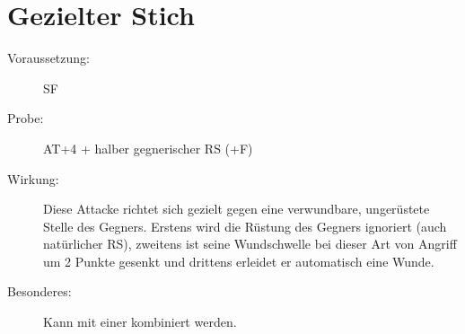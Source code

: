 \section{Gezielter Stich}
\label{bAT.gezielter_stich}
\begin{description}
    \item[Voraussetzung:]
        SF 
    \item[Probe:]
        AT+4 + halber gegnerischer RS (+F)
    \item[Wirkung:]
        Diese Attacke richtet sich gezielt gegen eine verwundbare, ungerüstete Stelle des Gegners.
        Erstens wird die Rüstung des Gegners ignoriert (auch natürlicher RS), zweitens ist seine Wundschwelle bei dieser Art von Angriff um 2 Punkte gesenkt und drittens erleidet er automatisch eine Wunde.
    \item[Besonderes:]
        Kann mit einer  kombiniert werden.
\end{description}
